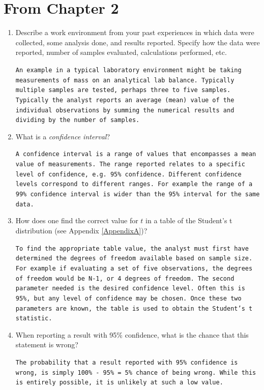 \section{From Chapter 2}
\begin{enumerate}
	\item Describe a work environment from your past experiences in which data were collected, some analysis done, and results reported.  Specify how the data were reported, number of samples evaluated, calculations performed, etc.
	

	{\small \texttt{An example in a typical laboratory environment might be taking measurements of mass on an analytical lab balance. Typically multiple samples are tested, perhaps three to five samples. Typically the analyst reports an average (mean) value of the individual observations by summing the numerical results and dividing by the number of samples.}}

	\item What is a \textit{confidence interval}?
	

	{\small \texttt{A confidence interval is a range of values that encompasses a mean value of measurements. The range reported relates to a specific level of confidence, e.g. 95\% confidence. Different confidence levels correspond to different ranges.  For example the range of a 99\% confidence interval is wider than the 95\% interval for the same data.}}

	
	\item How does one find the correct value for $ t $ in a table of the Student's t distribution (see Appendix \ref{AppendixA})?
	

	{\small \texttt{To find the appropriate table value, the analyst must first have determined the degrees of freedom available based on sample size. For example if evaluating a set of five observations, the degrees of freedom would be N-1, or 4 degrees of freedom. The second parameter needed is the desired confidence level. Often this is 95\%, but any level of confidence may be chosen.  Once these two parameters are known, the table is used to obtain the Student's t statistic.}}

	
	\item When reporting a result with 95\% confidence, what is the chance that this statement is wrong?
	

	{\small \texttt{The probability that a result reported with 95\% confidence is wrong, is simply 100\% - 95\% = 5\% chance of being wrong. While this is entirely possible, it is unlikely at such a low value.}}

\end{enumerate}

